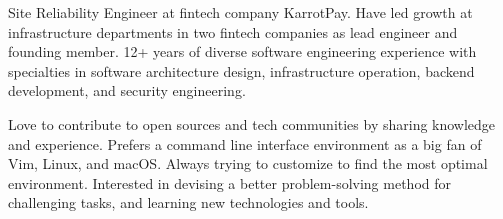 

\begin{cvparagraph}

Site Reliability Engineer at fintech company KarrotPay.
Have led growth at infrastructure departments in two fintech companies as lead engineer and founding member.
12+ years of diverse software engineering experience with specialties in software architecture design, infrastructure operation, backend development, and security engineering.

Love to contribute to open sources and tech communities by sharing knowledge and experience.
Prefers a command line interface environment as a big fan of Vim, Linux, and macOS.
Always trying to customize to find the most optimal environment.
Interested in devising a better problem-solving method for challenging tasks, and learning new technologies and tools.
\end{cvparagraph}
